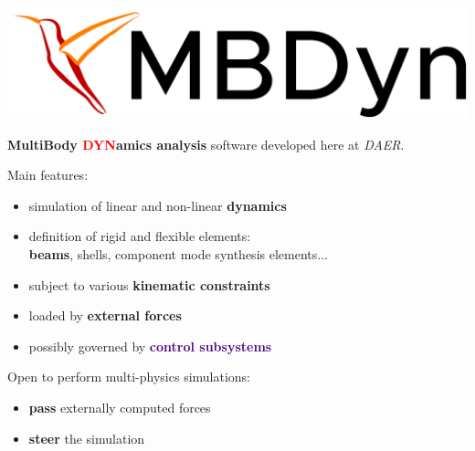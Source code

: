 \documentclass[10pt,t]{beamer}
\begin{document}
\begin{frame}{\includegraphics[width=.18\textwidth]{images/mbdyn.png}}

\textbf{\textcolor{dorange}{M}ulti\textcolor{dorange}{B}ody \textcolor{red}{DYN}amics analysis} software developed here at \textit{DAER}.\\


\vspace{5mm}

Main features:

    \begin{itemize}
        \item simulation of linear and non-linear \textbf{\textcolor{dorange}{dynamics}}
        \item definition of rigid and flexible elements:\\ \textbf{\textcolor{dblue}{beams}}, shells, component mode synthesis elements...
        \item subject to various \textbf{\textcolor{pblue}{kinematic constraints}}
        \item loaded by \textbf{\textcolor{fgreen}{external forces}}
        \item possibly governed by \textbf{\textcolor{indigo}{control subsystems}}
    \end{itemize}

\pause
\vspace{5mm}

Open to perform multi-physics simulations:
\begin{itemize}
    \item \textbf{pass} externally computed forces
    \item \textbf{steer} the simulation
\end{itemize}

\end{frame}
\end{document}
